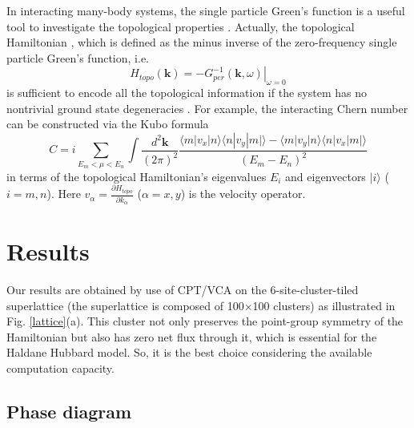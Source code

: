 \documentclass[12pt]{iopart}
\begin{document}
\par In interacting many-body systems, the single particle Green's function is a useful tool to investigate the topological properties \cite{V2003,G_PRB2011,WZ_PRX2012}. Actually, the topological Hamiltonian \cite{WY_JPCM2013}, which is defined as the minus inverse of the zero-frequency single particle Green's function, i.e.
\begin{equation}\label{TH}
H_{topo}(\mathbf{k})=\left.-G_{per}^{-1}(\mathbf{k},\omega)\right|_{\omega=0}
\end{equation}
is sufficient to encode all the topological information if the system has no nontrivial ground state degeneracies \cite{WZ_PRX2012}. For example, the interacting Chern number can be constructed via the Kubo formula \cite{TKNN_PRL1982}
\begin{equation}\label{KF}
C=i\sum_{E_m<\mu<E_n} \int\frac{d^2\mathbf{k}}{(2\pi)^2} \frac{\langle m|v_x|n\rangle\langle n|v_y|m|\rangle-\langle m|v_y|n\rangle\langle n|v_x|m|\rangle}{(E_m-E_n)^2}
\end{equation}
in terms of the topological Hamiltonian's eigenvalues $E_i$ and eigenvectors $|i\rangle$ ($i=m,n$). Here $v_\alpha=\frac{\partial H_{topo}}{\partial k_\alpha}$ ($\alpha=x,y$) is the velocity operator.

\section{Results}\label{R}

\par Our results are obtained by use of CPT/VCA on the 6-site-cluster-tiled superlattice (the superlattice is composed of 100$\times$100 clusters) as illustrated in Fig. \ref{lattice}(a). This cluster not only preserves the point-group symmetry of the Hamiltonian but also has zero net flux through it, which is essential for the Haldane Hubbard model. So, it is the best choice considering the available computation capacity.

\subsection{Phase diagram}
\end{document}
